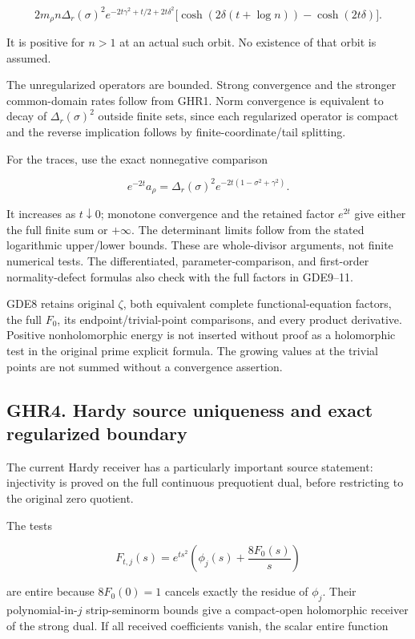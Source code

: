 \documentclass[
]{article}
\begin{document}
\[
2m_\rho n\Delta_r(\sigma)^2e^{-2t\gamma^2+t/2+2t\delta^2}
\bigl[\cosh(2\delta(t+\log n))-\cosh(2t\delta)\bigr].
\]

It is positive for \(n>1\) at an actual such orbit. No existence of that orbit is assumed.

The unregularized operators are bounded. Strong convergence and the stronger common-domain rates follow from GHR1. Norm convergence is equivalent to decay of \(\Delta_r(\sigma)^2\) outside finite sets, since each regularized operator is compact and the reverse implication follows by finite-coordinate/tail splitting.

For the traces, use the exact nonnegative comparison

\[
e^{-2t}a_\rho=\Delta_r(\sigma)^2
e^{-2t(1-\sigma^2+\gamma^2)}.
\]

It increases as \(t\downarrow0\); monotone convergence and the retained factor \(e^{2t}\) give either the full finite sum or \(+\infty\). The determinant limits follow from the stated logarithmic upper/lower bounds. These are whole-divisor arguments, not finite numerical tests. The differentiated, parameter-comparison, and first-order normality-defect formulas also check with the full factors in GDE9--11.

GDE8 retains original \(\zeta\), both equivalent complete functional-equation factors, the full \(F_0\), its endpoint/trivial-point comparisons, and every product derivative. Positive nonholomorphic energy is not inserted without proof as a holomorphic test in the original prime explicit formula. The growing values at the trivial points are not summed without a convergence assertion.

\subsection{GHR4. Hardy source uniqueness and exact regularized boundary}\label{ghr4.-hardy-source-uniqueness-and-exact-regularized-boundary}

The current Hardy receiver has a particularly important source statement: injectivity is proved on the full continuous prequotient dual, before restricting to the original zero quotient.

The tests

\[
F_{t,j}(s)=e^{ts^2}\left(\phi_j(s)+\frac{8F_0(s)}s\right)
\]

are entire because \(8F_0(0)=1\) cancels exactly the residue of \(\phi_j\). Their polynomial-in-\(j\) strip-seminorm bounds give a compact-open holomorphic receiver of the strong dual. If all received coefficients vanish, the scalar entire function
\end{document}
